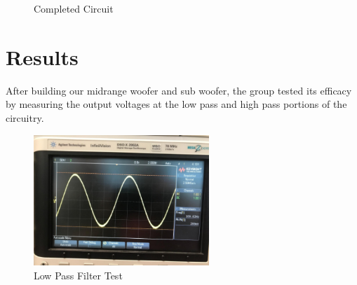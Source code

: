 \documentclass{article}
\begin{document}
\begin{figure}[h]
\begin{center}
\qquad \qquad \qquad
{}
\caption{Completed Circuit}
\end{center}
\end{figure}
\newpage

\section{Results}
After building our midrange woofer and sub woofer, the group tested its efficacy by measuring the output voltages at the low pass and high pass portions of the circuitry.

\begin{figure}[h]
\begin{center}
\includegraphics[width=250px]{LowPassFilterTest.png}
\caption{Low Pass Filter Test}
\end{center}
\end{figure}
\end{document}
